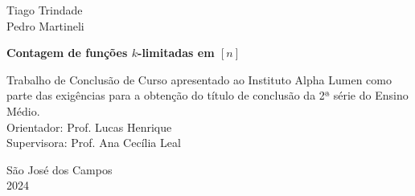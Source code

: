\begin{center}
  Tiago Trindade\\Pedro Martineli
\end{center}
\vspace{7cm}
\begin{center}
  \large \textbf{Contagem de funções $k$-limitadas em $[n]$}
\end{center}
\vspace{5cm}
\begin{flushright}
  \parbox{0.45\linewidth}{\sloppy
    Trabalho de Conclusão de Curso apresentado ao Instituto Alpha Lumen como parte das                 exigências para a obtenção do título de conclusão da 2ª série do Ensino Médio. \\[10pt]
    Orientador: Prof. Lucas Henrique \\[5pt]
    Supervisora: Prof. Ana Cecília Leal
  }
\end{flushright}
\vspace{4cm}
\begin{center}
  \normalsize São José dos Campos\\2024
\end{center}
\newpage
